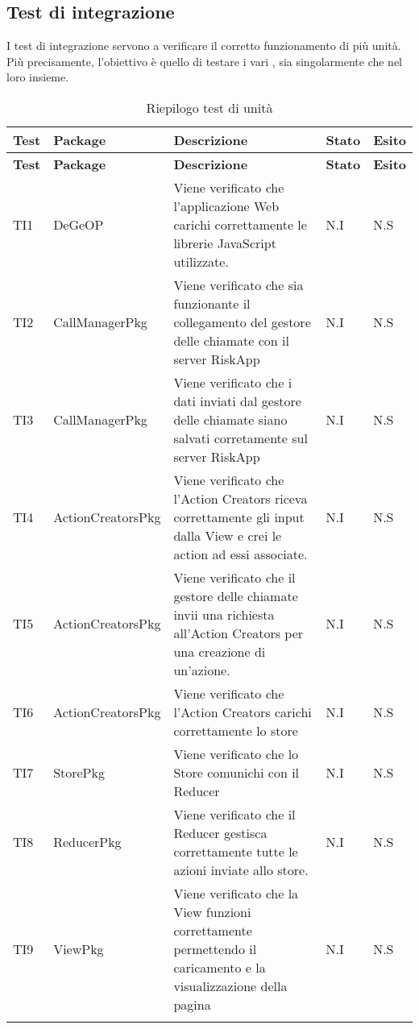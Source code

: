 	\subsection{Test di integrazione}
		I test di integrazione servono a verificare il corretto funzionamento di più unità. Più precisamente, l'obiettivo è quello di testare i vari , sia singolarmente che nel loro insieme.
	\def\arraystretch{1.5}
	\begin{longtable}{p{1cm}!{\VRule[1pt]}p{3cm}!{\VRule[1pt]}p{5cm}!{\VRule[1pt]}p{1.5cm}!{\VRule[1pt]}p{1.5cm}}
		\color{white} \textbf{Test} & \color{white} \textbf{Package} & \color{white} \textbf{Descrizione} & \color{white} \textbf{Stato} & \color{white} \textbf{Esito} \\ 
		\endfirsthead
		\color{white} \textbf{Test} & \color{white} \textbf{Package} & \color{white} \textbf{Descrizione} & \color{white} \textbf{Stato} & \color{white} \textbf{Esito} \\ 
		\endhead
		TI1 & DeGeOP & Viene verificato che l’applicazione Web carichi correttamente le librerie JavaScript utilizzate. & N.I & N.S\\
		TI2 & CallManagerPkg & Viene verificato che sia funzionante il collegamento del gestore delle chiamate con il server RiskApp & N.I & N.S\\
		TI3 & CallManagerPkg & Viene verificato che i dati inviati dal gestore delle chiamate siano salvati corretamente sul server RiskApp & N.I & N.S\\
		TI4 & ActionCreatorsPkg & Viene verificato che l’Action Creators riceva correttamente gli input dalla View e crei le action ad essi associate. & N.I & N.S\\
		TI5 & ActionCreatorsPkg & Viene verificato che il gestore delle chiamate invii una richiesta all'Action Creators per una creazione di un'azione. & N.I & N.S\\
		TI6 & ActionCreatorsPkg & Viene verificato che l'Action Creators carichi correttamente lo store & N.I & N.S\\
		TI7 & StorePkg & Viene verificato che lo Store comunichi con il Reducer & N.I & N.S\\
		TI8 & ReducerPkg & Viene verificato che il Reducer gestisca correttamente tutte le azioni inviate allo store. & N.I & N.S\\
		TI9 & ViewPkg & Viene verificato che la View funzioni correttamente permettendo il caricamento e la visualizzazione della pagina & N.I & N.S\\
		\caption{Riepilogo test di unità}
	\end{longtable}
	
